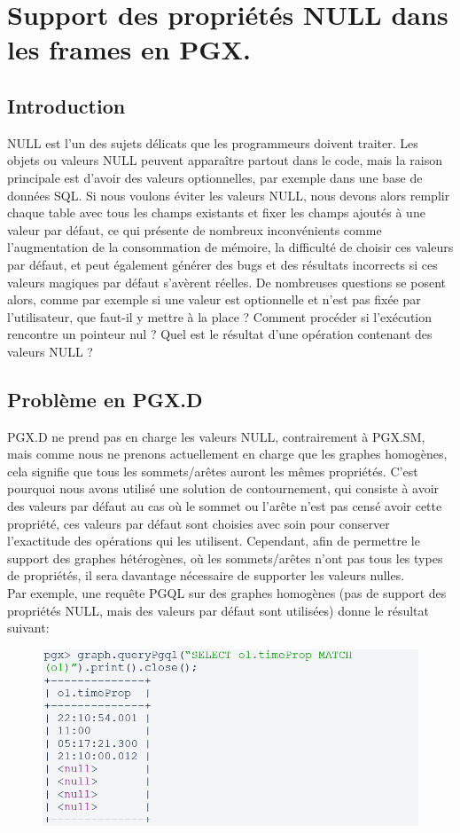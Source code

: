 \chapter{Support des propriétés NULL dans les frames en PGX.}
\section{Introduction}
NULL est l'un des sujets délicats que les programmeurs doivent traiter. Les objets ou valeurs NULL peuvent apparaître partout dans le code, mais la raison principale est d'avoir des valeurs optionnelles, par exemple dans une base de données SQL. Si nous voulons éviter les valeurs NULL, nous devons alors remplir chaque table avec tous les champs existants et fixer les champs ajoutés à une valeur par défaut, ce qui présente de nombreux inconvénients comme l'augmentation de la consommation de mémoire, la difficulté de choisir ces valeurs par défaut, et peut également générer des bugs et des résultats incorrects si ces valeurs magiques par défaut s'avèrent réelles. De nombreuses questions se posent alors, comme par exemple si une valeur est optionnelle et n'est pas fixée par l'utilisateur, que faut-il y mettre à la place ? Comment procéder si l'exécution rencontre un pointeur nul ? Quel est le résultat d'une opération contenant des valeurs NULL ?
\section{Problème en PGX.D}
PGX.D ne prend pas en charge les valeurs NULL, contrairement à PGX.SM, mais comme nous ne prenons actuellement en charge que les graphes homogènes, cela signifie que tous les sommets/arêtes auront les mêmes propriétés.  C'est pourquoi nous avons utilisé une solution de contournement, qui consiste à avoir des valeurs par défaut au cas où le sommet ou l'arête n'est pas censé avoir cette propriété, ces valeurs par défaut sont choisies avec soin pour conserver l'exactitude des opérations qui les utilisent. Cependant, afin de permettre le support des graphes hétérogènes, où les sommets/arêtes n'ont pas tous les types de propriétés, il sera davantage nécessaire de supporter les valeurs nulles.\\
Par exemple, une requête PGQL sur des graphes homogènes (pas de support des propriétés NULL, mais des valeurs par défaut sont utilisées) donne le résultat suivant:

\begin{figure}[H]  
  \centering
    \includegraphics[width=1\textwidth]{chapitre4/Figures/PGXD_query.png}
\end{figure}

